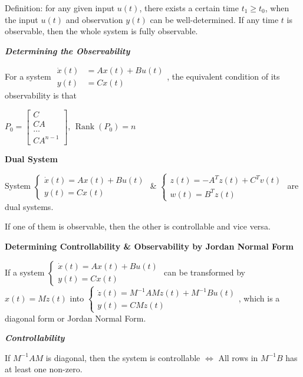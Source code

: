 \documentclass{article}
\newcommand{\bigtitle}[1]{
	\noindent
	\textbf{#1}
}
\newcommand{\smalltitle}[1]{
	\noindent
	\textbf{\textit{#1}}
}
\begin{document}
\begin{spacing}{1.2}
Definition: for any given input $u(t)$, there exists a certain time $t_1 \geq t_0$, when the input $u(t)$ and observation $y(t)$ can be well-determined. If any time $t$ is observable, then the whole system is fully observable.

\smalltitle{Determining the Observability}

For a system $\begin{aligned} \dot{x}(t) &=A x(t)+B u(t) \\ y(t) &=C x(t) \end{aligned}$, the equivalent condition of its observability is that

$P_{0}=\left[ \begin{array}{c}{C} \\ {C A} \\ {\ldots} \\ {C A^{n-1}}\end{array}\right]$, $\operatorname{Rank}(P_0) = n$


\bigtitle{Dual System}

System $\left\{\begin{array}{c}{\dot{x}(t)=A x(t)+B u(t)} \\ {y(t)=C x(t)}\end{array}\right.$ \& $\left\{\begin{array}{c}{z(t)=-A^{T} z(t)+C^{T} v(t)} \\ {w(t)=B^{T} z(t)}\end{array}\right.$ are dual systems.

If one of them is observable, then the other is controllable and vice versa.

\bigtitle{Determining Controllability \& Observability by Jordan Normal Form}

If a system 
$\left\{\begin{array}{c}{\dot{x}(t)=A x(t)+B u(t)} \\ {y(t)=C x(t)}\end{array}\right.$
can be transformed by $x(t)=M z(t)$ into $\left\{\begin{array}{c}{\dot{z}(t)=M^{-1} A M z(t)+M^{-1} B u(t)} \\ {y(t)=C M z(t)}\end{array}\right.$, which is a diagonal form or Jordan Normal Form.

\smalltitle{Controllability}

If $M^{-1}AM$ is diagonal, then the system is controllable $\Leftrightarrow$ All rows in $M^{-1}B$ has at least one non-zero.


\end{spacing}
\end{document}
